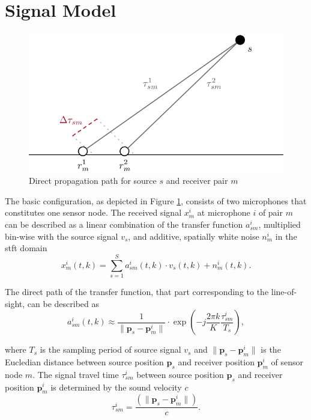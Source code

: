 \section{Signal Model}
\label{sec:signal}

\begin{figure}[!htp]
\centering
    \includegraphics[scale=0.7]{data/figures/signal2}
    \caption{Direct propagation path for source $s$ and receiver pair $m$}
    \label{fig:signal}
\end{figure}

The basic configuration, as depicted in Figure \ref{fig:signal}, consists of two microphones that constitutes one sensor node. The received signal $x^i_m$ at microphone $i$ of pair $m$ can be described as a linear combination of the transfer function $a^i_{sm}$, multiplied bin-wise with the source signal $v_s$, and additive, spatially white noise $n^i_m$ in the \acrfull{stft} domain
\begin{equation}
	x_m^i(t,k)=\sum_{s=1}^{S}a_{sm}^i(t,k)\cdot v_s(t,k)+n_m^i(t,k).
	\label{eq:received_signal}
\end{equation}


The direct path of the transfer function, that part corresponding to the line-of-sight, can be described as
\begin{equation}
	a_{sm}^i(t,k)\approx\frac{1}{\|\bm p_s-\bm p_m^i\|}\cdot\exp{\left(-j\frac{2\pi k}{K}\frac{\tau^i_{sm}}{T_s}\right)},
	\label{eq:acoustic_transfer_function}
\end{equation}


where $T_s$ is the sampling period of source signal $v_s$ and $\|\bm p_s-\bm p_m^i\|$ is the Eucledian distance between source position $\bm p_s$ and receiver position $\bm p^i_m$ of sensor node $m$. The signal travel time $\tau^i_{sm}$ between source position $\bm p_s$ and receiver position $\bm p^i_m$ is determined by the sound velocity $c$
\begin{equation}
	\tau^i_{sm}=\frac{\left(\|\bm p_s-\bm p_m^i\|\right)}{c}.
\end{equation}

